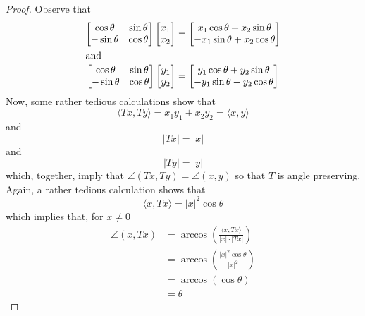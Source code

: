 \begin{enumerate}
    \begin{proof}
    Observe that
    \begin{align*}
        \begin{bmatrix} \cos \theta & \sin \theta \\ -\sin \theta & \cos \theta \end{bmatrix} \begin{bmatrix} x_1 \\ x_2 \end{bmatrix} &= \begin{bmatrix} x_1 \cos \theta + x_2 \sin \theta \\ -x_1 \sin \theta + x_2 \cos \theta \end{bmatrix} \\
        \intertext{and}
        \begin{bmatrix} \cos \theta & \sin \theta \\ -\sin \theta & \cos \theta \end{bmatrix} \begin{bmatrix} y_1 \\ y_2 \end{bmatrix} &= \begin{bmatrix} y_1 \cos \theta + y_2 \sin \theta \\ -y_1 \sin \theta + y_2 \cos \theta \end{bmatrix}
    \end{align*}
    Now, some rather tedious calculations show that
    \[
        \langle Tx, Ty \rangle = x_1y_1 + x_2y_2 = \langle x, y \rangle
    \]
    and
    \[
        \left| Tx \right| = \left| x \right|
    \]
    and
    \[
        \left| Ty \right| = \left| y \right|
    \]
    which, together, imply that \( \angle (Tx, Ty) = \angle (x,y) \) so that \( T \) is angle preserving. Again, a rather tedious calculation shows that
    \[
    \langle x, Tx \rangle = \left| x \right|^2 \cos \theta
    \]
    which implies that, for \( x \neq 0 \)
    \begin{align*}
        \angle(x, Tx) &= \arccos \left( \frac{\langle x, Tx \rangle}{\left| x \right| \cdot \left| Tx \right|} \right) \\
        &= \arccos \left( \frac{\left| x \right|^2 \cos \theta}{\left| x \right|^2} \right) \\
        &= \arccos (\cos \theta) \\
        &= \theta
    \end{align*}
    \end{proof}
    

\end{enumerate}
